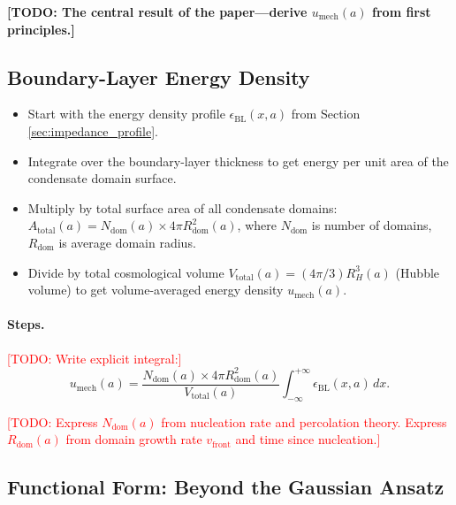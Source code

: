 \documentclass[11pt,a4paper]{article}
\newcommand{\umech}{\ensuremath{u_{\mathrm{mech}}}}
\theoremstyle{definition}
\theoremstyle{remark}
\begin{document}
\textbf{[TODO: The central result of the paper---derive $\umech(a)$ from first principles.]}

\subsection{Boundary-Layer Energy Density}
\label{sec:bl_energy_density}

\begin{itemize}[leftmargin=*, itemsep=0.3em]
\item Start with the energy density profile $\epsilon_{\mathrm{BL}}(x,a)$ from Section \ref{sec:impedance_profile}.
\item Integrate over the boundary-layer thickness to get energy per unit area of the condensate domain surface.
\item Multiply by total surface area of all condensate domains: $A_{\mathrm{total}}(a) = N_{\mathrm{dom}}(a) \times 4\pi R_{\mathrm{dom}}^2(a)$, where $N_{\mathrm{dom}}$ is number of domains, $R_{\mathrm{dom}}$ is average domain radius.
\item Divide by total cosmological volume $V_{\mathrm{total}}(a) = (4\pi/3) R_H^3(a)$ (Hubble volume) to get volume-averaged energy density $\umech(a)$.
\end{itemize}

\paragraph{Steps.}
\textcolor{red}{[TODO: Write explicit integral:]}
\begin{equation}
\umech(a) = \frac{N_{\mathrm{dom}}(a) \times 4\pi R_{\mathrm{dom}}^2(a)}{V_{\mathrm{total}}(a)} \int_{-\infty}^{+\infty} \epsilon_{\mathrm{BL}}(x,a) \, dx.
\label{eq:umech_integral}
\end{equation}

\textcolor{red}{[TODO: Express $N_{\mathrm{dom}}(a)$ from nucleation rate and percolation theory. Express $R_{\mathrm{dom}}(a)$ from domain growth rate $v_{\mathrm{front}}$ and time since nucleation.]}

\subsection{Functional Form: Beyond the Gaussian Ansatz}
\label{sec:functional_form}
\end{document}
